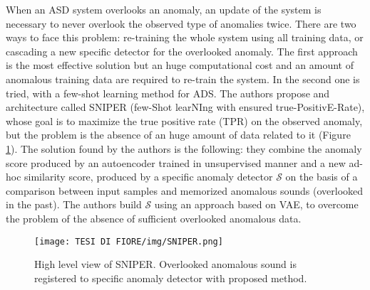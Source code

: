 When an ASD system overlooks an anomaly, an update of the system is necessary to never overlook the observed type of anomalies twice. There are two ways to face this problem: re-training the whole system using all training data, or cascading a new specific detector for the overlooked anomaly. The first approach is the most effective solution but an huge computational cost and an amount of anomalous training data are required to re-train the system. In \cite{25SNIPER} the second one is tried, with a few-shot learning method for ADS. The authors propose and architecture called SNIPER (few-Shot learNIng with ensured true-PositivE-Rate), whose goal is to maximize the true positive rate (TPR) on the observed anomaly, but the problem is the absence of an huge amount of data related to it (Figure \ref{SNIPER}). The solution found by the authors is the following: they combine the anomaly score produced by an autoencoder trained in unsupervised manner and a new ad-hoc similarity score, produced by a specific anomaly detector $\mathcal{S}$ on the basis of a comparison between input samples and memorized anomalous sounds (overlooked in the past). The authors build $\mathcal{S}$ using an approach based on VAE, to overcome the problem of the absence of sufficient overlooked anomalous data.
\begin{figure}[ht]
\texttt{[image: TESI DI FIORE/img/SNIPER.png]}
\centering
\caption{High level view of SNIPER. Overlooked anomalous sound is registered to specific anomaly detector with proposed method. \cite{25SNIPER}}
\label{SNIPER}
\end{figure}
